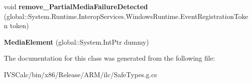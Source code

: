 \begin{DoxyCompactItemize}
\item 
\mbox{\label{class_windows_1_1_u_i_1_1_xaml_1_1_controls_1_1_media_element_a81a3770e7e088733e18c03ee7742f336}} 
void {\bfseries remove\+\_\+\+Partial\+Media\+Failure\+Detected} (global\+::\+System.\+Runtime.\+Interop\+Services.\+Windows\+Runtime.\+Event\+Registration\+Token token)
\item 
\mbox{\label{class_windows_1_1_u_i_1_1_xaml_1_1_controls_1_1_media_element_ae13aef29114c42026845e99e3644c2d9}} 
{\bfseries Media\+Element} (global\+::\+System.\+Int\+Ptr dummy)
\end{DoxyCompactItemize}


The documentation for this class was generated from the following file\+:\begin{DoxyCompactItemize}
\item 
I\+V\+S\+Calc/bin/x86/\+Release/\+A\+R\+M/ilc/Safe\+Types.\+g.\+cs\end{DoxyCompactItemize}
